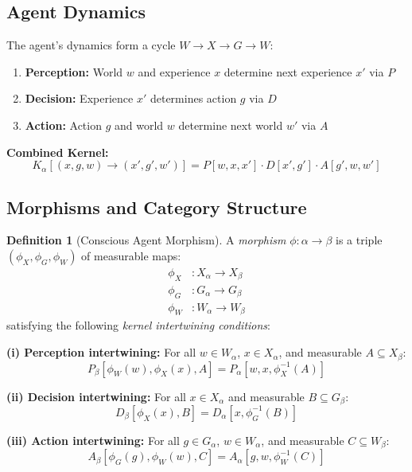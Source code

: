 \documentclass[11pt,a4paper]{article}
\theoremstyle{definition}
\newtheorem{definition}{Definition}[section]
\theoremstyle{plain}
\theoremstyle{remark}
\begin{document}
\subsection{Agent Dynamics}

The agent's dynamics form a cycle $W \to X \to G \to W$:
\begin{enumerate}
    \item \textbf{Perception:} World $w$ and experience $x$ determine next experience $x'$ via $P$
    \item \textbf{Decision:} Experience $x'$ determines action $g$ via $D$
    \item \textbf{Action:} Action $g$ and world $w$ determine next world $w'$ via $A$
\end{enumerate}

\textbf{Combined Kernel:}
\begin{equation}\label{eq:combined-kernel}
K_\alpha[(x, g, w) \to (x', g', w')] = P[w, x, x'] \cdot D[x', g'] \cdot A[g', w, w']
\end{equation}

\subsection{Morphisms and Category Structure}

\begin{definition}[Conscious Agent Morphism]\label{def:con-morphism}
A \emph{morphism} $\phi: \alpha \to \beta$ is a triple $(\phi_X, \phi_G, \phi_W)$ of measurable maps:
\begin{align*}
\phi_X&: X_\alpha \to X_\beta \\
\phi_G&: G_\alpha \to G_\beta \\
\phi_W&: W_\alpha \to W_\beta
\end{align*}
satisfying the following \emph{kernel intertwining conditions}:

\textbf{(i) Perception intertwining:} For all $w \in W_\alpha$, $x \in X_\alpha$, and measurable $A \subseteq X_\beta$:
\[
P_\beta[\phi_W(w), \phi_X(x), A] = P_\alpha[w, x, \phi_X^{-1}(A)]
\]

\textbf{(ii) Decision intertwining:} For all $x \in X_\alpha$ and measurable $B \subseteq G_\beta$:
\[
D_\beta[\phi_X(x), B] = D_\alpha[x, \phi_G^{-1}(B)]
\]

\textbf{(iii) Action intertwining:} For all $g \in G_\alpha$, $w \in W_\alpha$, and measurable $C \subseteq W_\beta$:
\[
A_\beta[\phi_G(g), \phi_W(w), C] = A_\alpha[g, w, \phi_W^{-1}(C)]
\]
\end{definition}
\end{document}
